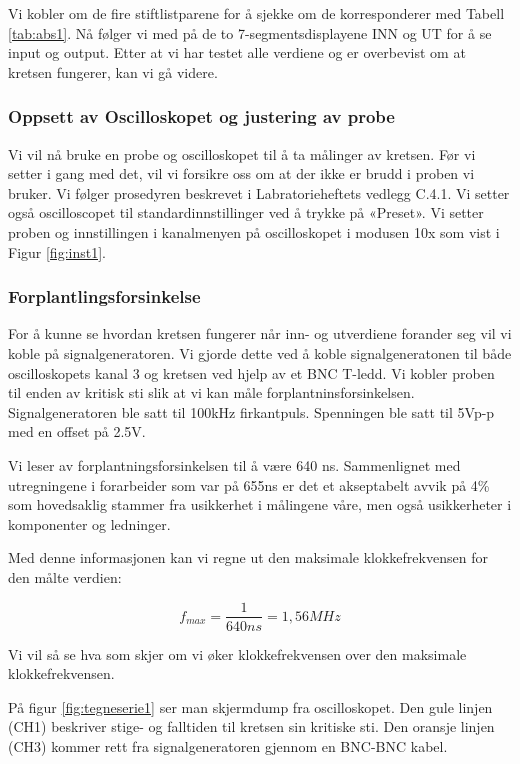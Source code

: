 \documentclass{article}
\begin{document}
Vi kobler om de fire stiftlistparene for å sjekke om de korresponderer med Tabell \ref{tab:abs1}. Nå følger vi med på de to 7-segmentsdisplayene INN og UT for å se input og output. Etter at vi har testet alle verdiene og er overbevist om at kretsen fungerer, kan vi gå videre.








\newpage
\subsubsection{Oppsett av Oscilloskopet og justering av probe}
Vi vil nå bruke en probe og oscilloskopet til å ta målinger av kretsen. Før vi setter i gang med det, vil vi forsikre oss om at der ikke er brudd i proben vi bruker. Vi følger prosedyren beskrevet i Labratorieheftets vedlegg C.4.1. Vi setter også oscilloscopet til standardinnstillinger ved å trykke på «Preset». Vi setter proben og innstillingen i kanalmenyen på oscilloskopet i modusen 10x som vist i Figur \ref{fig:inst1}.

\subsubsection{Forplantlingsforsinkelse}
For å kunne se hvordan kretsen fungerer når inn- og utverdiene forander seg vil vi koble på signalgeneratoren. Vi gjorde dette ved å koble signalgeneratonen til både oscilloskopets kanal 3 og kretsen ved hjelp av et BNC T-ledd. Vi kobler proben til enden av kritisk sti slik at vi kan måle forplantninsforsinkelsen. Signalgeneratoren ble satt til 100kHz firkantpuls. Spenningen ble satt til 5Vp-p med en offset på 2.5V.

Vi leser av forplantningsforsinkelsen til å være 640 ns. Sammenlignet med utregningene i forarbeider som var på 655ns er det et akseptabelt avvik på 4\% som hovedsaklig stammer fra usikkerhet i målingene våre, men også usikkerheter i komponenter og ledninger.

Med denne informasjonen kan vi regne ut den maksimale klokkefrekvensen for den målte verdien:

\begin{equation}
	f_{max} = \frac{1}{640ns} = 1,56 MHz
\end{equation}

Vi vil så se hva som skjer om vi øker klokkefrekvensen over den maksimale klokkefrekvensen.


På figur \ref{fig:tegneserie1} ser man skjermdump fra oscilloskopet. Den gule linjen (CH1) beskriver stige- og falltiden til kretsen sin kritiske sti. Den oransje linjen (CH3) kommer rett fra signalgeneratoren gjennom en BNC-BNC kabel.
\end{document}
